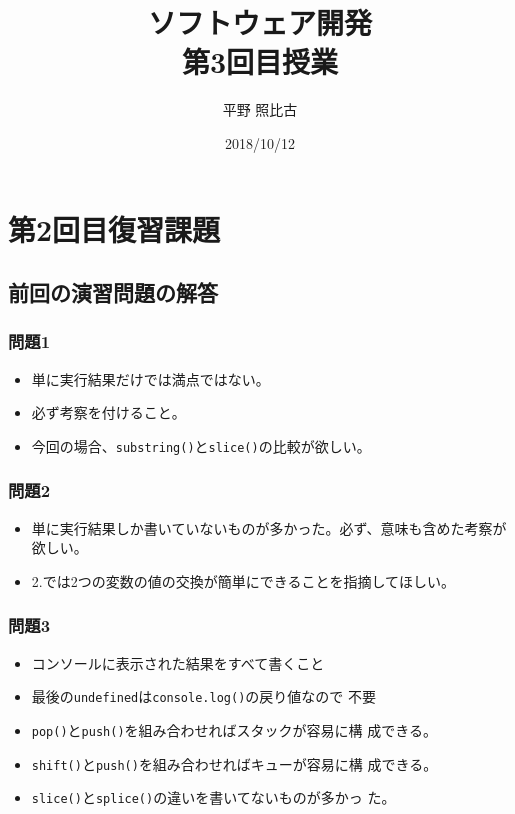 %

\title{ソフトウェア開発\\第3回目授業}
\author{平野 照比古}
\institute{}
\date{2018/10/12}

\frame{\maketitle}
\section{第2回目復習課題}
\subsection{前回の演習問題の解答}
  \begin{frame}[containsverbatim]
   \frametitle{問題1}
   \begin{itemize}
    \item 単に実行結果だけでは満点ではない。
    \item 必ず考察を付けること。
    \item 今回の場合、\texttt{substring()}と\texttt{slice()}の比較が欲しい。
   \end{itemize}
  \end{frame}
  \begin{frame}[containsverbatim]
   \frametitle{問題2}
\begin{itemize}
 \item    単に実行結果しか書いていないものが多かった。必ず、意味も含めた考察が
   欲しい。
 \item 2.では2つの変数の値の交換が簡単にできることを指摘してほしい。
\end{itemize}
  \end{frame}
  \begin{frame}[containsverbatim]
   \frametitle{問題3}
   \begin{itemize}
    \item コンソールに表示された結果をすべて書くこと
    \item 最後の\texttt{undefined}は\texttt{console.log()}の戻り値なので
          不要
    \item \texttt{pop()}と\texttt{push()}を組み合わせればスタックが容易に構
          成できる。
    \item \texttt{shift()}と\texttt{push()}を組み合わせればキューが容易に構
          成できる。
    \item \texttt{slice()}と\texttt{splice()}の違いを書いてないものが多かっ
          た。
   \end{itemize}
  \end{frame}
